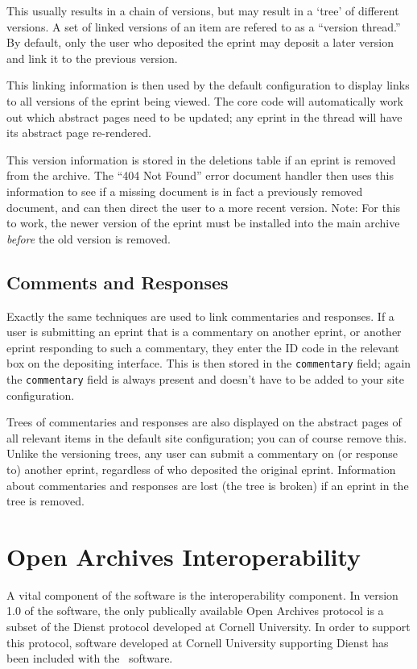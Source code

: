 This usually results in a chain of versions, but may result in a `tree' of different versions. A set of linked versions of an item are refered to as a ``version thread.'' By default, only the user who deposited the eprint may deposit a later version and link it to the previous version.

This linking information is then used by the default configuration to display links to all versions of the eprint being viewed. The core code will automatically work out which abstract pages need to be updated; any eprint in the thread will have its abstract page re-rendered.

This version information is stored in the deletions table if an eprint is removed from the archive. The ``404 Not Found'' error document handler then uses this information to see if a missing document is in fact a previously removed document, and can then direct the user to a more recent version. Note: For this to work, the newer version of the eprint must be installed into the main archive \emph{before} the old version is removed.


\subsection{Comments and Responses}

Exactly the same techniques are used to link commentaries and responses. If a user is submitting an eprint that is a commentary on another eprint, or another eprint responding to such a commentary, they enter the ID code in the relevant box on the depositing interface. This is then stored in the {\tt commentary} field; again the {\tt commentary} field is always present and doesn't have to be added to your site configuration.

Trees of commentaries and responses are also displayed on the abstract pages of all relevant items in the default site configuration; you can of course remove this. Unlike the versioning trees, any user can submit a commentary on (or response to) another eprint, regardless of who deposited the original eprint. Information about commentaries and responses are lost (the tree is broken) if an eprint in the tree is removed.


\section{Open Archives Interoperability}

A vital component of the software is the interoperability component. In version 1.0 of the software, the only publically available Open Archives protocol is a subset of the Dienst protocol developed at Cornell University. In order to support this protocol, software developed at Cornell University supporting Dienst has been included with the \eprints\ software.

